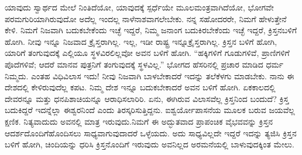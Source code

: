 \vskip 5pt

ಯಾವುದು ಸ್ವಾರ್ಥದ ಮೇಲೆ ನಿಂತಿದೆಯೋ, ಯಾವುದಕ್ಕೆ ಸ್ಪರ್ಧೆಯೇ ಮೂಲ\break ಮಂತ್ರವಾಗಿದೆಯೋ, ಭೋಗವೇ ಪರಮಗುರಿಯಾಗಿರುವುದೋ ಅದೆಲ್ಲ ಇಂದಲ್ಲ ನಾಳೆ\break ನಾಶವಾಗಲೇಬೇಕು. ನನ್ನ ಸಹೋದರರೇ, ನಿಮಗೆ ಹೇಳುತ್ತೇನೆ ಕೇಳಿ. ನಿಮಗೆ ನಿಜವಾಗಿ ಬದುಕಬೇಕೆಂದು ಇಚ್ಛೆ ಇದ್ದರೆ, ನಿಮ್ಮ ಜನಾಂಗ ಬದುಕಿರಬೇಕೆಂದು ಇಚ್ಛೆ ಇದ್ದರೆ, ಕ್ರಿಸ್ತನ\break ಬಳಿಗೆ ಹೋಗಿ. ನೀವು ಇನ್ನೂ ನಿಜವಾದ ಕ್ರೈಸ್ತರಾಗಿಲ್ಲ. ಇಲ್ಲ, ಇಡೀ ರಾಷ್ಟ್ರ ಇನ್ನೂ\break ಕ್ರೈಸ್ತರಾಗಿಲ್ಲ. ಕ್ರಿಸ್ತನ ಬಳಿಗೆ ಹೋಗಿ, ಯಾರಿಗೆ ತಂಗುವುದಕ್ಕೆ ಎಲ್ಲಿಯೂ ಸ್ಥಳವಿರಲಿಲ್ಲವೋ ಅವನ ಬಳಿಗೆ ಹೋಗಿ. “ಹಕ್ಕಿಗಳಿಗೆ ಗೂಡುಗಳಿವೆ, ಪ್ರಾಣಿಗಳಿಗೆ ಪೊದೆಗಳಿವೆ; ಆದರೆ ಮಾನವ ಪುತ್ರನಿಗೆ ತಂಗುವುದಕ್ಕೆ ಸ್ಥಳವಿಲ್ಲ.” ಭೋಗದ ಹೆಸರಿನಲ್ಲಿ ಪ್ರಚಾರ ಮಾಡಿದ ಧರ್ಮ ನಿಮ್ಮದು. ಎಂತಹ ವಿಧಿವಿಲಾಸ ಇದು! ನೀವು ನಿಜವಾಗಿ ಬಾಳಬೇಕಾದರೆ ಇದನ್ನು ತಲೆಕೆಳಗು ಮಾಡಬೇಕು. ನಾನು ಈ ದೇಶದಲ್ಲಿ ಕೇಳಿರುವುದೆಲ್ಲ ಕಪಟ. ನಿಮ್ಮ ದೇಶ ಇನ್ನೂ ಬದುಕಬೇಕಾದರೆ ಅವನ ಬಳಿಗೆ ಹೋಗಿ. ಏಕಕಾಲದಲ್ಲಿ ದೇವರನ್ನೂ ಮತ್ತು ಧನಪಿಶಾಚಿಯನ್ನೂ ಆರಾಧಿಸಲಾರಿರಿ. ಏನು, ಈಗಿರುವ ವಿಲಾಸವೆಲ್ಲ ಕ್ರಿಸ್ತನಿಂದ ಬಂದುದೆ? ಕ್ರಿಸ್ತ ಬದುಕಿದ್ದರೆ ಇದನ್ನೆಲ್ಲಾ ಈಶ್ವರನಿಂದೆ ಎಂದು ತಿರಸ್ಕರಿಸುತ್ತಿದ್ದನು. ಐಶ್ವರ್ಯೋಪಾಸನೆಯ ಮೂಲಕ ಬರುವ ಜಯವೆಲ್ಲ ಕ್ಷಣಿಕ. ನಿತ್ಯವಾದುದು ಅವನಲ್ಲಿ ಮಾತ್ರ ಇರುವುದು.\break ನಿಮಗೆ ಈ ಅದ್ಭುತವಾದ ಪ್ರಾಪಂಚಿಕ ವೈಭವವನ್ನು ಕ್ರಿಸ್ತನ ಆದರ್ಶದೊಂದಿಗೆ\break ಹೊಂದಿಸಲು ಸಾಧ್ಯವಾಗುವುದಾದರೆ ಒಳ್ಳೆಯದು. ಅದು ಸಾಧ್ಯವಿಲ್ಲದೇ ಇದ್ದರೆ ಇದನ್ನು ತ್ಯಜಿಸಿ ಕ್ರಿಸ್ತನ ಬಳಿಗೆ ಹೋಗಿ, ಚಿಂದಿಯನ್ನು ಧರಿಸಿ ಕ್ರಿಸ್ತನೊಂದಿಗೆ ಇರುವುದು ಅವನಿಲ್ಲದ ಅರಮನೆಯಲ್ಲಿ ಬಾಳುವುದಕ್ಕಿಂತ ಮೇಲು.

\eject

